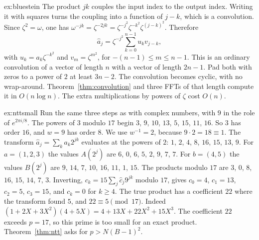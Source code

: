 \begin{solution}{ex:bluestein}
\idea The product $jk$ couples the input index to the output index. Writing it with squares turns the coupling into a function of $j-k$, which is a convolution.
\writeup Since $\zeta^2=\omega$, one has $\omega^{-jk}=\zeta^{-2jk}=\zeta^{-j^2}\zeta^{-k^2}\zeta^{(j-k)^2}$. Therefore
\[
\hat a_j=\zeta^{-j^2}\sum_{k=0}^{n-1}u_kv_{j-k},
\]
with $u_k=a_k\zeta^{-k^2}$ and $v_m=\zeta^{m^2}$, for $-(n-1)\le m\le n-1$. This is an ordinary convolution of a vector of length $n$ with a vector of length $2n-1$. Pad both with zeros to a power of $2$ at least $3n-2$. The convolution becomes cyclic, with no wrap-around. Theorem~\ref{thm:convolution} and three FFTs of that length compute it in $O(n\log n)$. The extra multiplications by powers of $\zeta$ cost $O(n)$.
\end{solution}

\begin{solution}{ex:nttsmall}
\idea Run the same three steps as with complex numbers, with $9$ in the role of $e^{2\pi i/8}$.
\writeup The powers of $3$ modulo $17$ begin $3$, $9$, $10$, $13$, $5$, $15$, $11$, $16$. So $3$ has order $16$, and $w=9$ has order $8$. We use $w^{-1}=2$, because $9\cdot2=18\equiv1$. The transform $\hat a_j=\sum_k a_k 2^{jk}$ evaluates at the powers of $2$: $1$, $2$, $4$, $8$, $16$, $15$, $13$, $9$. For $a=(1,2,3)$ the values $A(2^j)$ are $6$, $0$, $6$, $5$, $2$, $9$, $7$, $7$. For $b=(4,5)$ the values $B(2^j)$ are $9$, $14$, $7$, $10$, $16$, $11$, $1$, $15$. The products modulo $17$ are $3$, $0$, $8$, $16$, $15$, $14$, $7$, $3$. Inverting, $c_k=15\sum_j\hat c_j 9^{jk}$ modulo $17$, gives $c_0=4$, $c_1=13$, $c_2=5$, $c_3=15$, and $c_k=0$ for $k\ge4$. The true product has a coefficient $22$ where the transform found $5$, and $22\equiv5\pmod{17}$. Indeed $(1+2X+3X^2)(4+5X)=4+13X+22X^2+15X^3$. The coefficient $22$ exceeds $p=17$, so this prime is too small for an exact product. Theorem~\ref{thm:ntt} asks for $p>N(B-1)^2$.
\end{solution}

